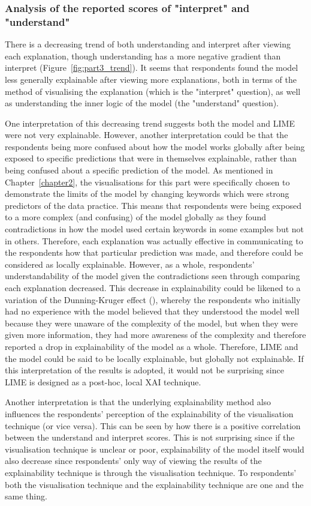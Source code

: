 \subsubsection{Analysis of the reported scores of "interpret" and "understand"}
There is a decreasing trend of both understanding and interpret after viewing each explanation, though understanding has a more negative gradient than interpret (Figure~\ref{fig:part3_trend}). It seems that respondents found the model less generally explainable after viewing more explanations, both in terms of the method of visualising the explanation (which is the "interpret" question), as well as understanding the inner logic of the model (the "understand" question). 

One interpretation of this decreasing trend suggests both the model and LIME were not very explainable. However, another interpretation could be that the respondents being more confused about how the model works globally after being exposed to specific predictions that were in themselves explainable, rather than being confused about a specific prediction of the model. As mentioned in Chapter~\ref{chapter2}, the visualisations for this part were specifically chosen to demonstrate the limits of the model by changing keywords which were strong predictors of the data practice. This means that respondents were being exposed to a more complex (and confusing) of the model globally as they found contradictions in how the model used certain keywords in some examples but not in others. Therefore, each explanation was actually effective in communicating to the respondents how that particular prediction was made, and therefore could be considered as locally explainable. However, as a whole, respondents' understandability of the model given the contradictions seen through comparing each explanation decreased. This decrease in explainability could be likened to a variation of the Dunning-Kruger effect (\cite{dunning_kruger}), whereby the respondents who initially had no experience with the model believed that they understood the model well because they were unaware of the complexity of the model, but when they were given more information, they had more awareness of the complexity and therefore reported a drop in explainability of the model as a whole. Therefore, LIME and the model could be said to be locally explainable, but globally not explainable. If this interpretation of the results is adopted, it would not be surprising since LIME is designed as a post-hoc, local XAI technique.

Another interpretation is that the underlying explainability method also influences the respondents' perception of the explainability of the visualisation technique (or vice versa). This can be seen by how there is a positive correlation between the understand and interpret scores. This is not surprising since if the visualisation technique is unclear or poor, explainability of the model itself would also decrease since respondents' only way of viewing the results of the explainability technique is through the visualisation technique. To respondents' both the visualisation technique and the explainability technique are one and the same thing.

